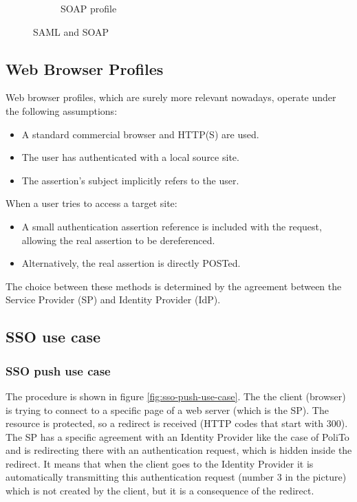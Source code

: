 \begin{figure}[H]
\begin{subfigure}{.4\textwidth}
    \label{fig:soap-profile}
    \caption{SOAP profile}
  \end{subfigure}
  \caption{SAML and SOAP}
\end{figure}


\subsection{Web Browser Profiles}

Web browser profiles, which are surely more relevant nowadays, operate
under the following assumptions:
\begin{itemize}
    \item A standard commercial browser and HTTP(S) are used.
    \item The user has authenticated with a local source site.
    \item The assertion’s subject implicitly refers to the user.
\end{itemize}

When a user tries to access a target site:
\begin{itemize}
    \item A small authentication assertion reference is included with
      the request, allowing the real assertion to be dereferenced.
    \item Alternatively, the real assertion is directly POSTed.
\end{itemize}

The choice between these methods is determined by the agreement
between the Service Provider (SP) and Identity Provider (IdP).

\subsection{SSO use case}
\subsubsection{SSO push use case}
The procedure is shown in figure \ref{fig:sso-push-use-case}. The the
client (browser) is trying to connect  to a specific page of a web
server (which is the SP). The resource is protected, so a redirect is
received (HTTP codes that start with 300). The SP has a specific
agreement with an Identity Provider like the case of PoliTo and is
redirecting there with an authentication request, which is hidden
inside the redirect. It means that when the client goes to the
Identity Provider it is automatically transmitting this authentication
request (number 3 in the picture) which is not created by the client,
but it is a consequence of the redirect.

